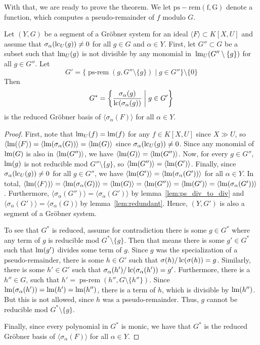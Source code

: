 With that, we are ready to prove the theorem. We let $\operatorname{ps-rem(f, G)}$ denote a function, which computes a pseudo-remainder of $f$ modulo $G$.

\begin{theorem}\label{thm:reduce_grb_system}
  Let $(Y, G)$ be a segment of a Gröbner system for an ideal $\langle F \rangle \subset K[X, U]$ and assume that $\sigma_{\alpha}(\operatorname{lc}_{U}(g)) \neq 0$ for all $g \in G$ and $\alpha \in Y$. First, let $G'' \subset G$ be a subset such that $\operatorname{lm}_{U}(g)$ is not divisible by any monomial in $\,\operatorname{lm}_{U}(G'' \setminus \{g\})$ for all $g \in G''$. Let
  \[G' = \{\operatorname{ps-rem}(g, G'' \setminus \{g\}) \mid g \in G''\} \setminus \{0\}\]
  Then
  \[G^{*} = \left\{\frac{\sigma_{\alpha}(g)}{\operatorname{lc}(\sigma_{\alpha}(g))} \;\bigg|\; g \in G'\right\}\]
  is the reduced Gröbner basis of $\langle \sigma_{\alpha}(F) \rangle$ for all $\alpha \in Y$.
\end{theorem}
\begin{proof}
  First, note that $\operatorname{lm}_{U}(f) = \operatorname{lm}(f)$ for any $f \in K[X, U]$ since $X \gg U$, so $\langle \operatorname{lm}(\langle F \rangle) = \langle \operatorname{lm}(\sigma_{\alpha}(G)) \rangle = \langle \operatorname{lm}(G) \rangle$ since $\sigma_{\alpha}(\operatorname{lc}_{U}(g)) \neq 0$. Since any monomial of $\operatorname{lm}(G)$ is also in $\langle \operatorname{lm}(G'') \rangle$, we have $\langle \operatorname{lm}(G) \rangle = \langle \operatorname{lm}(G'') \rangle$. Now, for every $g \in G''$, $\operatorname{lm}(g)$ is not reducible mod $G'' \setminus \{g\}$, so $\langle \operatorname{lm}(G'') \rangle = \langle \operatorname{lm}(G') \rangle$. Finally, since $\sigma_{\alpha}(\operatorname{lc}_{U}(g)) \neq 0$ for all $g \in G''$, we have $\langle \operatorname{lm}(G') \rangle = \langle \operatorname{lm}(\sigma_{\alpha}(G')) \rangle$ for all $\alpha \in Y$. In total, $\langle \operatorname{lm}(\langle F \rangle) \rangle = \langle \operatorname{lm}(\sigma_{\alpha}(G)) \rangle = \langle \operatorname{lm}(G) \rangle = \langle \operatorname{lm}(G'') \rangle = \langle \operatorname{lm}(G') \rangle = \langle \operatorname{lm}(\sigma_{\alpha}(G')) \rangle$. Furthermore, $\langle \sigma_{\alpha}(G'') \rangle = \langle \sigma_{\alpha}(G') \rangle$ by lemma~\ref{lem:ps_div_to_div} and $\langle \sigma_{\alpha}(G') \rangle = \langle \sigma_{\alpha}(G) \rangle$ by lemma~\ref{lem:redundant}. Hence, $(Y, G')$ is also a segment of a Gröbner system.

  To see that $G^{*}$ is reduced, assume for contradiction there is some $g \in G^{*}$ where any term of $g$ is reducible mod $G^{*} \setminus \{g\}$. Then that means there is some $g' \in G^{*}$ such that $\operatorname{lm}(g')$ divides some term of $g$. Since $g$ was the specialization of a pseudo-remainder, there is some $h \in G'$ such that $\sigma(h)/\operatorname{lc}(\sigma(h)) = g$. Similarly, there is some $h' \in G'$ such that $\sigma_{\alpha}(h')/\operatorname{lc}(\sigma_{\alpha}(h')) = g'$. Furthermore, there is a $h'' \in G$, such that $h' = \operatorname{ps-rem}(h'', G \setminus \{h''\})$. Since $\operatorname{lm}(\sigma_{\alpha}(h')) = \operatorname{lm}(h') = \operatorname{lm}(h'')$, there is a term of $h$, which is divisible by $\operatorname{lm}(h'')$. But this is not allowed, since $h$ was a pseudo-remainder. Thus, $g$ cannot be reducible mod $G^{*} \setminus \{g\}$.

  Finally, since every polynomial in $G^*$ is monic, we have that $G^{*}$ is the reduced Gröbner basis of $\langle \sigma_{\alpha}(F) \rangle$ for all $\alpha \in Y$.
\end{proof}

